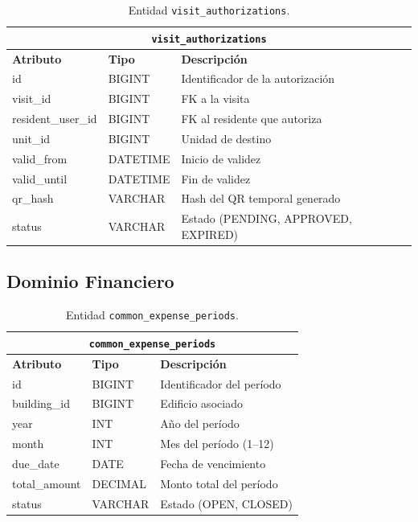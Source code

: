 \begin{table}[H]
\centering
\small
\begin{tabular}{|p{}|p{}|p{}|}
\hline
\multicolumn{3}{|c|}{\textbf{\texttt{visit\_authorizations}}} \\ \hline
\textbf{Atributo} & \textbf{Tipo} & \textbf{Descripción} \\ \hline
id & BIGINT & Identificador de la autorización \\ \hline
visit\_id & BIGINT & FK a la visita \\ \hline
resident\_user\_id & BIGINT & FK al residente que autoriza \\ \hline
unit\_id & BIGINT & Unidad de destino \\ \hline
valid\_from & DATETIME & Inicio de validez \\ \hline
valid\_until & DATETIME & Fin de validez \\ \hline
qr\_hash & VARCHAR & Hash del QR temporal generado \\ \hline
status & VARCHAR & Estado (PENDING, APPROVED, EXPIRED) \\ \hline
\end{tabular}
\caption{Entidad \texttt{visit\_authorizations}.}
\end{table}

\subsection{Dominio Financiero}

\begin{table}[H]
\centering
\small
\begin{tabular}{|p{}|p{}|p{}|}
\hline
\multicolumn{3}{|c|}{\textbf{\texttt{common\_expense\_periods}}} \\ \hline
\textbf{Atributo} & \textbf{Tipo} & \textbf{Descripción} \\ \hline
id & BIGINT & Identificador del período \\ \hline
building\_id & BIGINT & Edificio asociado \\ \hline
year & INT & Año del período \\ \hline
month & INT & Mes del período (1--12) \\ \hline
due\_date & DATE & Fecha de vencimiento \\ \hline
total\_amount & DECIMAL & Monto total del período \\ \hline
status & VARCHAR & Estado (OPEN, CLOSED) \\ \hline
\end{tabular}
\caption{Entidad \texttt{common\_expense\_periods}.}
\end{table}

